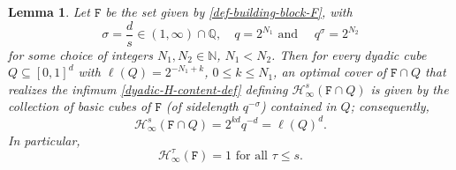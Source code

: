\documentclass[a4paper,11pt]{amsart}
\newtheorem{lem}[thm]{\bf Lemma}
\numberwithin{equation}{section}
\begin{document}
\begin{lem} \label{Building-block-Hcontent-lemma} 
Let $\mathtt F$ be the set given by \eqref{def-building-block-F}, with 
\[ \sigma = \frac{d}{s} \in (1, \infty)\cap \mathbb Q, \quad  q = 2^{N_1} \text{ and }  \quad q^{\sigma} = 2^{N_2} \] 
for some choice of integers $N_1, N_2 \in \mathbb N$, $N_1 < N_2$. Then for every dyadic cube $Q \subseteq [0,1]^d$ with $\ell(Q) = 2^{-N_1+k}$, $0 \leq k \leq N_1$, an optimal cover of $\mathtt F \cap Q$ that realizes the infimum \eqref{dyadic-H-content-def} defining $\mathcal H_{\infty}^{s}(\mathtt F \cap Q)$ is given by the collection of basic cubes of $\mathtt F$ (of sidelength $q^{-\sigma}$) contained in $Q$; consequently,  
\begin{equation} \mathcal H_{\infty}^{s}(\mathtt F \cap Q) = 2^{kd} q^{-d} = \ell(Q)^{d}.   \label{Hcontent-induction} \end{equation} 
In particular, 
\begin{equation} \label{F-H-content-1} 
\mathcal H_{\infty}^{\tau}(\mathtt F) = 1 \text{ for all } \tau \leq s.
\end{equation} 
\end{lem} 
\end{document}
